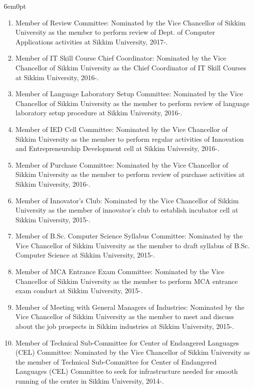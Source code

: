 \documentclass[11pt,a4paper]{moderncv}
\begin{document}
\begin{adjustwidth}{6em}{0pt}
\begin{enumerate}
		\item Member of Review Committee: Nominated by the Vice Chancellor of Sikkim University as the member to perform review of Dept. of Computer Applications activities at Sikkim University, 2017-.
		
		\item Member of IT Skill Course Chief Coordinator: Nominated by the Vice Chancellor of Sikkim University as the Chief Coordinator of IT Skill Courses at Sikkim University, 2016-.
		
		\item Member of Language Laboratory Setup Committee: Nominated by the Vice Chancellor of Sikkim University as the member to perform review of language laboratory setup procedure at Sikkim University, 2016-.
		
		\item Member of IED Cell Committee: Nominated by the Vice Chancellor of Sikkim University as the member to perform regular activities of Innovation and Entrepreneurship Development cell at Sikkim University, 2016-.
		
		\item Member of Purchase Committee: Nominated by the Vice Chancellor of Sikkim University as the member to perform review of purchase activities at Sikkim University, 2016-.
		
		\item Member of Innovator's Club: Nominated by the Vice Chancellor of Sikkim University as the member of innovator's club to establish incubator cell at Sikkim University, 2015-.
		
		\item Member of B.Sc. Computer Science Syllabus Committee: Nominated by the Vice Chancellor of Sikkim University as the member to draft syllabus of B.Sc. Computer Science at Sikkim University, 2015-.
		
		\item Member of MCA Entrance Exam Committee: Nominated by the Vice Chancellor of Sikkim University as the member to perform MCA entrance exam conduct at Sikkim University, 2015-.
		
		\item Member of Meeting with General Managers of Industries: Nominated by the Vice Chancellor of Sikkim University as the member to meet and discuss about the job prospects in Sikkim industries at Sikkim University, 2015-.
		
		\item Member of Technical Sub-Committee for Center of Endangered Languages (CEL) Committee: Nominated by the Vice Chancellor of Sikkim University as the member of Technical Sub-Committee for Center of Endangered Languages (CEL) Committee to seek for infrastructure needed for smooth running of the center in Sikkim University, 2014-.
		

\end{enumerate}
\end{adjustwidth}
\end{document}
